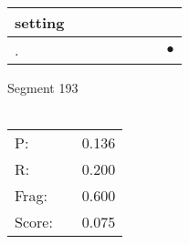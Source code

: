 \documentclass[landscape]{article}
\newcommand{\ssp}{\hspace{2pt}}
\newcommand{\mex}{\cellcolor{g}$\bullet$}
\begin{document}
\begin{tabular}{|l|p{10pt}|p{10pt}|p{10pt}|p{10pt}|p{10pt}|p{10pt}|p{10pt}|}
\hline
\ssp setting \ssp&\hspace{2pt}&\hspace{2pt}&\hspace{2pt}&\hspace{2pt}&\hspace{2pt}&\hspace{2pt}&\hspace{2pt}\\
\hline
\ssp \cellcolor{ref6}. \ssp&\hspace{2pt}&\hspace{2pt}&\hspace{2pt}&\hspace{2pt}&\hspace{2pt}&\hspace{2pt}&\hspace{2pt}\mex\\
\hline
\end{tabular}

\vspace{6pt}
\noindent Segment 193\\\\
\noindent\begin{tabular}{lm{12pt}r}
\hline
P:&&0.136\\
R:&&0.200\\
Frag:&&0.600\\
Score:&&0.075\\
\end{tabular}

\newpage
\end{document}
